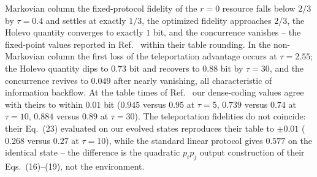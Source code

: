 \documentclass[aps,prb,twocolumn,superscriptaddress,longbibliography]{revtex4-2}
\begin{document}
Markovian column the fixed-protocol fidelity of the $r=0$ resource falls
below $2/3$ by $\tau=0.4$ and settles at exactly $1/3$, the optimized
fidelity approaches $2/3$, the Holevo quantity converges to exactly $1$
bit, and the concurrence vanishes -- the fixed-point values reported in
Ref.~\cite{Haddadi2023} within their table rounding. In the
non-Markovian column the first loss of the teleportation advantage
occurs at $\tau=2.55$; the Holevo quantity dips to $0.73$ bit and
recovers to $0.88$ bit by $\tau=30$, and the concurrence revives to
$0.049$ after nearly vanishing, all characteristic of information
backflow. At the table times of Ref.~\cite{Haddadi2023} our
dense-coding values agree with theirs to within $0.01$ bit ($0.945$
versus $0.95$ at $\tau=5$, $0.739$ versus $0.74$ at $\tau=10$,
$0.884$ versus $0.89$ at $\tau=30$). The teleportation fidelities do
not coincide: their Eq.~(23) evaluated on our evolved states reproduces
their table to $\pm0.01$ ($0.268$ versus $0.27$ at $\tau=10$), while
the standard linear protocol gives $0.577$ on the identical state --
the difference is the quadratic $p_{i}p_{j}$ output construction of
their Eqs.~(16)--(19), not the environment.
\end{document}
